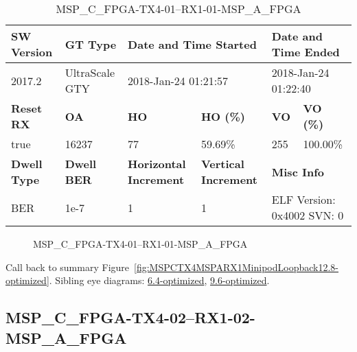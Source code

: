 \begin{table}[h]
\centering
\caption{MSP\_C\_FPGA-TX4-01--RX1-01-MSP\_A\_FPGA}
\label{tab:MSPCFPGATX401RX101MSPAFPGA12.8-optimized}
\begin{tabular}{@{}|l|l|l|l|l|l|@{}}
\toprule
\textbf{SW Version}                & \textbf{GT Type}   & \multicolumn{2}{l|}{\textbf{Date and Time Started}}            & \multicolumn{2}{l|}{\textbf{Date and Time Ended}}        \\ \midrule
2017.2                       & UltraScale GTY          & \multicolumn{2}{l|}{2018-Jan-24 01:21:57}                   & \multicolumn{2}{l|}{2018-Jan-24 01:22:40}               \\ \midrule
\textbf{Reset RX}                  & \textbf{OA} & \textbf{HO}   & \textbf{HO (\%)} & \textbf{VO} & \textbf{VO (\%)} \\ \midrule
true & 16237        & 77          & 59.69\%        & 255        & 100.00\%       \\ \midrule
\textbf{Dwell Type}                & \textbf{Dwell BER} & \textbf{Horizontal Increment} & \textbf{Vertical Increment}    & \multicolumn{2}{l|}{\textbf{Misc Info}}                  \\ \midrule
BER                            & 1e-7        & 1        & 1           & \multicolumn{2}{l|}{ELF Version: 0x4002 SVN: 0}                         \\ \bottomrule
\end{tabular}
\end{table}

\begin{figure}[h]
\caption{MSP\_C\_FPGA-TX4-01--RX1-01-MSP\_A\_FPGA} \label{fig:MSPCFPGATX401RX101MSPAFPGA12.8-optimized}
\end{figure}

Call back to summary Figure~\ref{fig:MSPCTX4MSPARX1MinipodLoopback12.8-optimized}.
Sibling eye diagrams: \hyperref[sec:MSPCFPGATX401RX101MSPAFPGA6.4-optimized]{6.4-optimized}, \hyperref[sec:MSPCFPGATX401RX101MSPAFPGA9.6-optimized]{9.6-optimized}.

\clearpage
\newpage


\subsection{MSP\_C\_FPGA-TX4-02--RX1-02-MSP\_A\_FPGA}\label{sec:MSPCFPGATX402RX102MSPAFPGA12.8-optimized}

